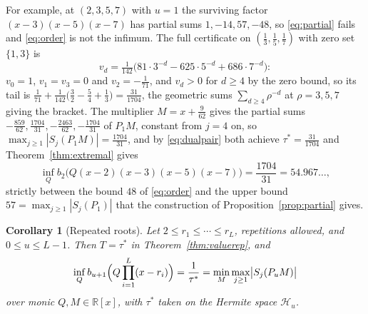 \documentclass[11pt]{article}
\newtheorem{corollary}[theorem]{Corollary}
\theoremstyle{definition}
\theoremstyle{plain}
\newcommand{\R}{\mathbb R}
\begin{document}
For example, at $(2,3,5,7)$ with $u=1$ the surviving factor
$(x-3)(x-5)(x-7)$ has partial sums $1,-14,57,-48$, so \eqref{eq:partial}
fails and \eqref{eq:order} is not the infimum.  The full certificate on
$(\tfrac13,\tfrac15,\tfrac17)$ with zero set $\{1,3\}$ is
\[
  v_d=\tfrac1{142}\bigl(81\cdot3^{-d}-625\cdot5^{-d}+686\cdot7^{-d}\bigr):
\]
$v_0=1$, $v_1=v_3=0$ and $v_2=-\tfrac1{71}$, and $v_d>0$ for $d\ge4$ by the
zero bound, so its tail is
$\tfrac1{71}+\tfrac1{142}\bigl(\tfrac32-\tfrac54+\tfrac13\bigr)=\tfrac{31}{1704}$,
the geometric sums $\sum_{d\ge4}\rho^{-d}$ at $\rho=3,5,7$ giving the
bracket.  The multiplier $M=x+\tfrac9{62}$ gives the partial sums
$-\tfrac{859}{62},\tfrac{1704}{31},-\tfrac{2463}{62},-\tfrac{1704}{31}$ of
$P_1M$, constant from $j=4$ on, so
$\max_{j\ge1}|S_j(P_1M)|=\tfrac{1704}{31}$, and by \eqref{eq:dualpair} both
achieve $\tau^*=\tfrac{31}{1704}$ and Theorem~\ref{thm:extremal} gives
\[
  \inf_Qb_2\bigl(Q(x-2)(x-3)(x-5)(x-7)\bigr)=\frac{1704}{31}=54.967\ldots,
\]
strictly between the bound $48$ of \eqref{eq:order} and the upper bound
$57=\max_{j\ge1}|S_j(P_1)|$ that the construction of
Proposition~\ref{prop:partial} gives.

\begin{corollary}[Repeated roots]\label{cor:extremalrep}
Let $2\le r_1\le\cdots\le r_L$, repetitions allowed, and $0\le u\le L-1$.
Then $T=\tau^*$ in Theorem~\ref{thm:valuerep}, and
\[
  \inf_Qb_{u+1}\Bigl(Q\prod_{i=1}^L(x-r_i)\Bigr)=\frac1{\tau^*}
  =\min_M\max_{j\ge1}\bigl|S_j(P_uM)\bigr|
\]
over monic $Q,M\in\R[x]$, with $\tau^*$ taken on the Hermite space
$\mathcal H_u$.
\end{corollary}
\end{document}
